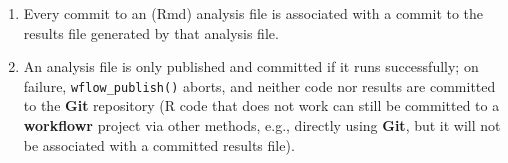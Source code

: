 \documentclass[9pt,a4paper]{extarticle}
\begin{document}
\begin{enumerate}

\item Every commit to an (Rmd) analysis file is associated with a commit
to the results file generated by that analysis file.

\item An analysis file is only published and committed if it runs
successfully; on failure, \texttt{wflow\_publish()} aborts, and neither code nor
results are committed to the \textbf{Git} repository (R code that does not work
can still be committed to a \textbf{workflowr} project via other methods, e.g.,
directly using \textbf{Git}, but it will not be associated with a committed
results file).

\end{enumerate}
\end{document}
